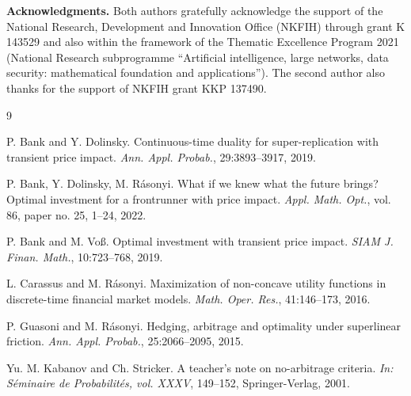 \documentclass[a4paper]{article}
\begin{document}
\medskip{}

{\footnotesize \noindent\textbf{Acknowledgments.} Both authors gratefully 
acknowledge the support of 
the National Research, Development and Innovation Office (NKFIH) through grant K 143529 
and also within the framework of the Thematic Excellence Program 2021 (National Research subprogramme 
``Artificial intelligence, large networks, data security: mathematical foundation and applications'').
The second author also thanks for the support of NKFIH grant KKP 137490.}


%
%


\begin{thebibliography}{9}

 P. Bank and Y. Dolinsky.
\newblock Continuous-time duality for super-replication with transient price impact.
\newblock \emph{Ann. Appl. Probab.}, 29:3893--3917, 2019.  

 P. Bank, Y. Dolinsky, M. R\'asonyi.{}
\newblock What if we knew what the future brings? Optimal investment for a frontrunner with price impact.
\newblock \emph{Appl. Math. Opt.}, vol. 86, paper no. 25, 1--24, 2022.

 P. Bank and M. Vo\ss{}.
\newblock Optimal investment with transient price impact.
\newblock \emph{SIAM J. Finan. Math.}, 10:723--768, 2019. 

 L. Carassus and M. R\'asonyi.{}
\newblock Maximization of non-concave utility functions in
discrete-time financial market models. 
\newblock \emph{Math. Oper. Res.}, 41:146--173, 2016.





 P. Guasoni and M. R\'asonyi.{}
\newblock Hedging, arbitrage and optimality under superlinear friction.
\newblock \emph{Ann. Appl. Probab.}, 25:2066--2095, 2015.

 Yu. M. Kabanov and Ch. Stricker. 
\noindent A teacher’s note on no-arbitrage criteria.
\noindent \emph{In:
Séminaire de Probabilités, vol. XXXV}, 149--152, Springer-Verlag, 2001.


\end{thebibliography}
\end{document}
